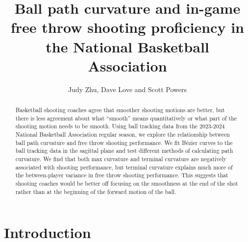 \documentclass[Review,sageh,times,doublespace]{sagej}
\begin{document}

\title{Ball path curvature and in-game free throw shooting proficiency in the National Basketball Association}

\author{Judy Zhu, Dave Love and Scott Powers}




\begin{abstract}
  Basketball shooting coaches agree that smoother shooting motions are better, but there is less agreement about what ``smooth'' means quantitatively or what part of the shooting motion needs to be smooth. Using ball tracking data from the 2023-2024 National Basketball Association regular season, we explore the relationship between ball path curvature and free throw shooting performance. We fit Bézier curves to the ball tracking data in the sagittal plane and test different methods of calculating path curvature. We find that both max curvature and terminal curvature are negatively associated with shooting performance, but terminal curvature explains much more of the between-player variance in free throw shooting performance. This suggests that shooting coaches would be better off focusing on the smoothness at the end of the shot rather than at the beginning of the forward motion of the ball.
\end{abstract}


\maketitle

  \section{Introduction}
\end{document}
